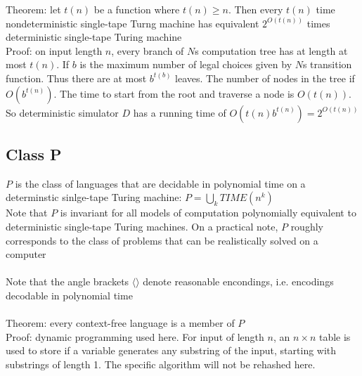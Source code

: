\documentclass{article}
\newcommand*{\<}{\langle}
\renewcommand*{\>}{\rangle}
\begin{document}
			Theorem: let $t(n)$ be a function where $t(n) \geq n$. Then every $t(n)$ time nondeterministic single-tape Turng machine has equivalent $2^{O(t(n))}$ times deterministic single-tape Turing machine \\
			Proof: on input length $n$, every branch of $N$s computation tree has at length at most $t(n)$. If $b$ is the maximum number of legal choices given by $N$s transition function. Thus there are at most $b^{t(b)}$ leaves. The number of nodes in the tree if $O(b^{t(n)})$. The time to start from the root and traverse a node is $O(t(n))$. So deterministic simulator $D$ has a running time of $O(t(n)b^{t(n)}) = 2^{O(t(n))}$
		\subsection{Class P}
			$P$ is the class of languages that are decidable in polynomial time on a determinstic sinlge-tape Turing machine: $P = \bigcup_k TIME(n^k)$ \\
			Note that $P$ is invariant for all models of computation polynomially equivalent to deterministic single-tape Turing machines. On a practical note, $P$ roughly corresponds to the class of problems that can be realistically solved on a computer \\
			\\
			Note that the angle brackets $\<\>$ denote reasonable encondings, i.e. encodings decodable in polynomial time \\
			\\
			Theorem: every context-free language is a member of $P$ \\
			Proof: dynamic programming used here. For input of length $n$, an $n \times n$ table is used to store if a variable generates any substring of the input, starting with substrings of length 1. The specific algorithm will not be rehashed here. 
\end{document}
